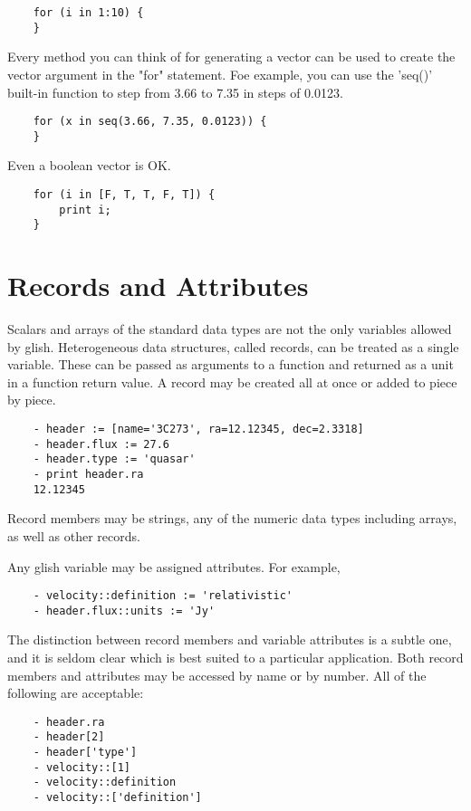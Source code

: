 \begin{verbatim}
	for (i in 1:10) {
	}
\end{verbatim}

Every method you can think of for generating a vector can be used to create
the vector argument in the "for" statement.  Foe example, you can use the
'seq()' built-in function to step from 3.66 to 7.35 in steps of 0.0123.

\begin{verbatim}
	for (x in seq(3.66, 7.35, 0.0123)) {
	}
\end{verbatim}

Even a boolean vector is OK.

\begin{verbatim}
	for (i in [F, T, T, F, T]) {
	    print i;
	}
\end{verbatim}

\section{Records and Attributes}

    Scalars and arrays of the standard data types are not the only
variables allowed by glish.  Heterogeneous data structures, called records,
can be treated as a single variable.  These can be passed as arguments to a
function and returned as a unit in a function return value.  A record may be
created all at once or added to piece by piece.

\begin{verbatim}
	- header := [name='3C273', ra=12.12345, dec=2.3318]
	- header.flux := 27.6
	- header.type := 'quasar'
	- print header.ra
	12.12345
\end{verbatim}

    Record members may be strings, any of the numeric data types
including arrays, as well as other records.

    Any glish variable may be assigned attributes.  For example,

\begin{verbatim}
	- velocity::definition := 'relativistic'
	- header.flux::units := 'Jy'
\end{verbatim}

The distinction between record members and variable attributes is a subtle
one, and it is seldom clear which is best suited to a particular
application.  Both record members and attributes may be accessed by name or
by number.  All of the following are acceptable:

\begin{verbatim}
	- header.ra
	- header[2]
	- header['type']
	- velocity::[1]
	- velocity::definition
	- velocity::['definition']
\end{verbatim}

